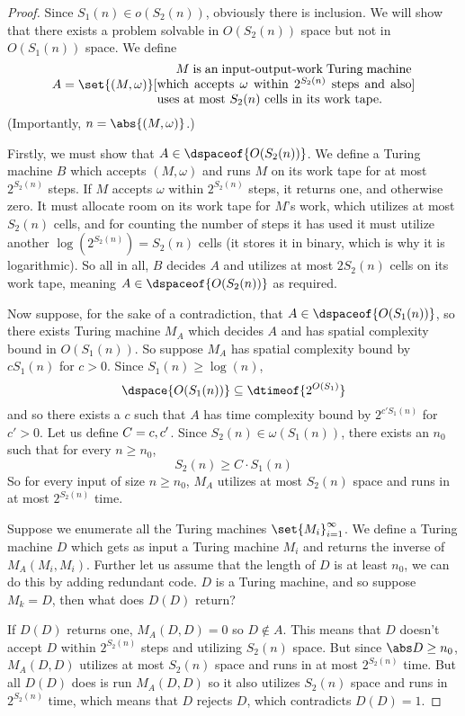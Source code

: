 \documentclass[10pt]{article}
\begin{document}
\begin{proof}

    Since $S_1(n)\in o(S_2(n))$, obviously there is inclusion.
    We will show that there exists a problem solvable in $O(S_2(n))$ space but not in $O(S_1(n))$ space.
    We define
    \[ A = \set{(M,\omega)}[\vcenter{\advance\hsize by-5cm
    $M$ is an input-output-work Turing machine which accepts $\omega$ within $2^{S_2(n)}$ steps and also uses at most $S_2(n)$ cells in its work tape.}] \]
    (Importantly, $n=\abs{(M,\omega)}$.)

    Firstly, we must show that $A\in\dspaceof{O(S_2(n))}$.
    We define a Turing machine $B$ which accepts $(M,\omega)$ and runs $M$ on its work tape for at most $2^{S_2(n)}$ steps.
    If $M$ accepts $\omega$ within $2^{S_2(n)}$ steps, it returns one, and otherwise zero.
    It must allocate room on its work tape for $M$'s work, which utilizes at most $S_2(n)$ cells, and for counting the number of steps it has used it must utilize another $\log(2^{S_2(n)})=S_2(n)$ cells
    (it stores it in binary, which is why it is logarithmic).
    So all in all, $B$ decides $A$ and utilizes at most $2S_2(n)$ cells on its work tape, meaning $A\in\dspaceof{O(S_2(n))}$ as required.

    Now suppose, for the sake of a contradiction, that $A\in\dspaceof{O(S_1(n))}$, so there exists Turing machine $M_A$ which decides $A$ and has spatial complexity bound in $O(S_1(n))$.
    So suppose $M_A$ has spatial complexity bound by $cS_1(n)$ for $c>0$.
    Since $S_1(n)\geq\log(n)$,
    \[ \dspace{O(S_1(n))} \subseteq \dtimeof{2^{O(S_1)}} \]
    and so there exists a $c$ such that $A$ has time complexity bound by $2^{c'S_1(n)}$ for $c'>0$.
    Let us define $C=\maxof{c,c'}$.
    Since $S_2(n)\in\omega(S_1(n))$, there exists an $n_0$ such that for every $n\geq n_0$,
    \[ S_2(n) \geq C\cdot S_1(n) \]
    So for every input of size $n\geq n_0$, $M_A$ utilizes at most $S_2(n)$ space and runs in at most $2^{S_2(n)}$ time.

    Suppose we enumerate all the Turing machines $\set{M_i}_{i=1}^\infty$.
    We define a Turing machine $D$ which gets as input a Turing machine $M_i$ and returns the inverse of $M_A(M_i,M_i)$.
    Further let us assume that the length of $D$ is at least $n_0$, we can do this by adding redundant code.
    $D$ is a Turing machine, and so suppose $M_k=D$, then what does $D(D)$ return?
    \benum
        \item If $D(D)$ returns one, $M_A(D,D)=0$ so $D\notin A$.
        This means that $D$ doesn't accept $D$ within $2^{S_2(n)}$ steps and utilizing $S_2(n)$ space.
        But since $\abs D\geq n_0$, $M_A(D,D)$ utilizes at most $S_2(n)$ space and runs in at most $2^{S_2(n)}$ time.
        But all $D(D)$ does is run $M_A(D,D)$ so it also utilizes $S_2(n)$ space and runs in $2^{S_2(n)}$ time, which means that $D$ rejects $D$, which contradicts $D(D)=1$.


\end{proof}
\end{document}
